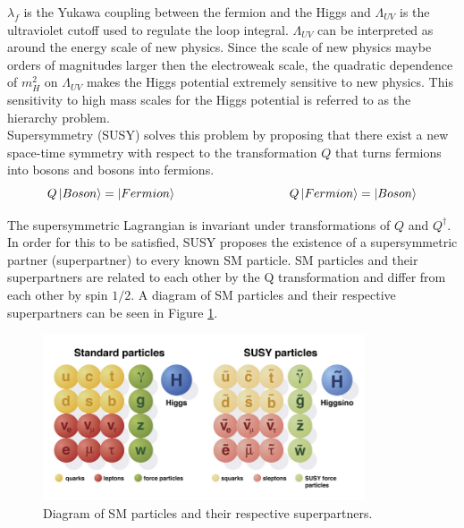 \indent $\lambda_f$ is the Yukawa coupling between the fermion and the Higgs and $\Lambda_{UV}$ is the ultraviolet cutoff used to regulate the loop integral.  $\Lambda_{UV}$ can be interpreted as around the energy scale of new physics.  Since the scale of new physics maybe orders of magnitudes larger then the electroweak scale, the quadratic dependence of $m_H^2$ on $\Lambda_{UV}$ makes the Higgs potential extremely sensitive to new physics. This sensitivity to high mass scales for the Higgs potential is referred to as the hierarchy problem.  \\ %

\indent Supersymmetry (SUSY) solves this problem by proposing that there exist a new space-time symmetry with respect to the transformation $Q$ that turns fermions into bosons and bosons into fermions.\\

\begin{equation}
\label{eqn:Higgs:Loopf}
Q\ket{Boson} = \ket{Fermion} ~~~~~~~~~~~~~~~~~~~~~~~~~~~~ Q\ket{Fermion} = \ket{Boson}
\end{equation}

\indent The supersymmetric Lagrangian is invariant under transformations of $Q$ and $Q^{\dagger}$.  In order for this to be satisfied, SUSY proposes the existence of a supersymmetric partner (superpartner) to every known SM particle.  SM particles and their superpartners are related to each other by the Q transformation and differ from each other by spin $1/2$. A diagram of SM particles and their respective superpartners can be seen in Figure \ref{fig:SUSYpart2}.  \\

\begin{figure}[h!]
\centering
    \includegraphics[width=0.85\textwidth]{figures/strategy/SUSYparticles.jpg}\hspace{0.05\textwidth}
\caption[Diagram of SM particles and their respective superpartners]{ Diagram of SM particles and their respective superpartners. }
\label{fig:SUSYpart2}
\end{figure}

